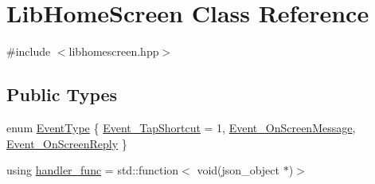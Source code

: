 \hypertarget{class_lib_home_screen}{}\section{Lib\+Home\+Screen Class Reference}
\label{class_lib_home_screen}


{\ttfamily \#include $<$libhomescreen.\+hpp$>$}

\subsection*{Public Types}
\begin{DoxyCompactItemize}
\item 
enum \hyperlink{class_lib_home_screen_a82616c91ac211d2ad08e709b524bf154}{Event\+Type} \{ \hyperlink{class_lib_home_screen_a82616c91ac211d2ad08e709b524bf154a4b0a82d501e4db5fbfe25c254c92896f}{Event\+\_\+\+Tap\+Shortcut} = 1, 
\hyperlink{class_lib_home_screen_a82616c91ac211d2ad08e709b524bf154aea56fa32a124a8ddcbea127755280a1d}{Event\+\_\+\+On\+Screen\+Message}, 
\hyperlink{class_lib_home_screen_a82616c91ac211d2ad08e709b524bf154acae91db4efc2394fd701f581d277a3fd}{Event\+\_\+\+On\+Screen\+Reply}
 \}
\item 
using \hyperlink{class_lib_home_screen_a334f11f81c84c98d18284215dcaada3a}{handler\+\_\+func} = std\+::function$<$ void(json\+\_\+object $\ast$)$>$
\end{DoxyCompactItemize}
